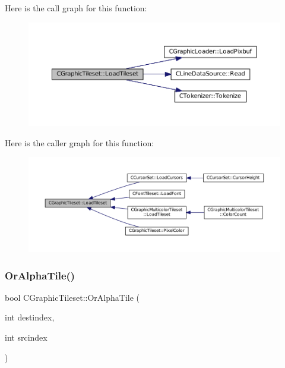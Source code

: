 Here is the call graph for this function\+:\nopagebreak
\begin{figure}[H]
\begin{center}
\leavevmode
\includegraphics[width=350pt]{classCGraphicTileset_a7d47754f26f03958be28a064f54eef1d_cgraph}
\end{center}
\end{figure}
Here is the caller graph for this function\+:\nopagebreak
\begin{figure}[H]
\begin{center}
\leavevmode
\includegraphics[width=350pt]{classCGraphicTileset_a7d47754f26f03958be28a064f54eef1d_icgraph}
\end{center}
\end{figure}
\hypertarget{classCGraphicTileset_ae456fe77a33c9954b6a22133f5843a15}{}\label{classCGraphicTileset_ae456fe77a33c9954b6a22133f5843a15} 
\subsubsection{\texorpdfstring{Or\+Alpha\+Tile()}{OrAlphaTile()}}
{\footnotesize\ttfamily bool C\+Graphic\+Tileset\+::\+Or\+Alpha\+Tile (\begin{DoxyParamCaption}\item[{int}]{destindex,  }\item[{int}]{srcindex }\end{DoxyParamCaption})}



